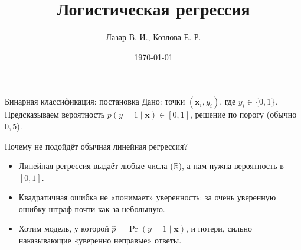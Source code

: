 \documentclass[11pt,aspectratio=169]{beamer}
\title{Логистическая регрессия}
\author{Лазар В. И., Козлова Е. Р.}
\date{\today}
\begin{document}
\begin{frame}
	\titlepage
\end{frame}



\begin{frame}{Бинарная классификация: постановка}
	\small
	Дано: точки $(\mathbf x_i, y_i)$, где $y_i\in\{0,1\}$. Предсказываем вероятность $p(y=1\mid\mathbf x)\in[0,1]$, решение по порогу (обычно $0{,}5$).

	\vspace{2mm}
\end{frame}

\begin{frame}{Почему не подойдёт обычная линейная регрессия?}
	\small
	\begin{itemize}
		\item Линейная регрессия выдаёт любые числа (\(\mathbb R\)), а нам нужна вероятность в \([0,1]\).
		\item Квадратичная ошибка не «понимает» уверенность: за очень уверенную ошибку штраф почти как за небольшую.
		\item Хотим модель, у которой \(\hat p=\Pr(y=1\mid\mathbf x)\), и потери, сильно наказывающие «уверенно неправые» ответы.
	\end{itemize}
\end{frame}
\end{document}
